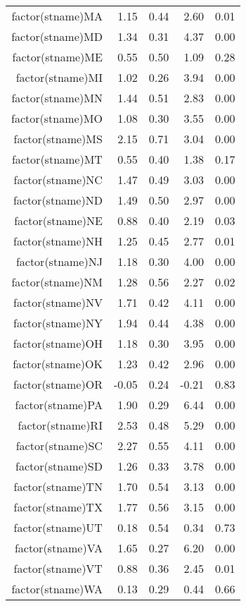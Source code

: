 \begin{table}[ht]
\begin{tabular}{rrrrr}
  factor(stname)MA & 1.15 & 0.44 & 2.60 & 0.01 \\ 
  factor(stname)MD & 1.34 & 0.31 & 4.37 & 0.00 \\ 
  factor(stname)ME & 0.55 & 0.50 & 1.09 & 0.28 \\ 
  factor(stname)MI & 1.02 & 0.26 & 3.94 & 0.00 \\ 
  factor(stname)MN & 1.44 & 0.51 & 2.83 & 0.00 \\ 
  factor(stname)MO & 1.08 & 0.30 & 3.55 & 0.00 \\ 
  factor(stname)MS & 2.15 & 0.71 & 3.04 & 0.00 \\ 
  factor(stname)MT & 0.55 & 0.40 & 1.38 & 0.17 \\ 
  factor(stname)NC & 1.47 & 0.49 & 3.03 & 0.00 \\ 
  factor(stname)ND & 1.49 & 0.50 & 2.97 & 0.00 \\ 
  factor(stname)NE & 0.88 & 0.40 & 2.19 & 0.03 \\ 
  factor(stname)NH & 1.25 & 0.45 & 2.77 & 0.01 \\ 
  factor(stname)NJ & 1.18 & 0.30 & 4.00 & 0.00 \\ 
  factor(stname)NM & 1.28 & 0.56 & 2.27 & 0.02 \\ 
  factor(stname)NV & 1.71 & 0.42 & 4.11 & 0.00 \\ 
  factor(stname)NY & 1.94 & 0.44 & 4.38 & 0.00 \\ 
  factor(stname)OH & 1.18 & 0.30 & 3.95 & 0.00 \\ 
  factor(stname)OK & 1.23 & 0.42 & 2.96 & 0.00 \\ 
  factor(stname)OR & -0.05 & 0.24 & -0.21 & 0.83 \\ 
  factor(stname)PA & 1.90 & 0.29 & 6.44 & 0.00 \\ 
  factor(stname)RI & 2.53 & 0.48 & 5.29 & 0.00 \\ 
  factor(stname)SC & 2.27 & 0.55 & 4.11 & 0.00 \\ 
  factor(stname)SD & 1.26 & 0.33 & 3.78 & 0.00 \\ 
  factor(stname)TN & 1.70 & 0.54 & 3.13 & 0.00 \\ 
  factor(stname)TX & 1.77 & 0.56 & 3.15 & 0.00 \\ 
  factor(stname)UT & 0.18 & 0.54 & 0.34 & 0.73 \\ 
  factor(stname)VA & 1.65 & 0.27 & 6.20 & 0.00 \\ 
  factor(stname)VT & 0.88 & 0.36 & 2.45 & 0.01 \\ 
  factor(stname)WA & 0.13 & 0.29 & 0.44 & 0.66 \\ 

\end{tabular}
\end{table}
